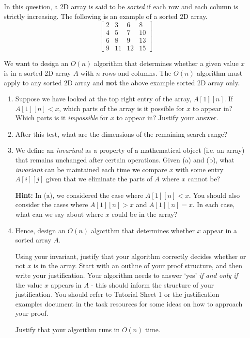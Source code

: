 \documentclass[12pt]{article}
\begin{document}

\begin{question}
In this question, a 2D array is said to be \emph{sorted} if each row and each column is strictly increasing. The following is an example of a sorted 2D array.
\[\begin{bmatrix}
    2 & 3 & 6 & 8 \\
    4 & 5 & 7 & 10 \\
    6 & 8 & 9 & 13 \\
    9 & 11 & 12 & 15
\end{bmatrix}\]

We want to design an $O(n)$ algorithm that determines whether a given value $x$ is in a sorted 2D array $A$ with $n$ rows and columns. The $O(n)$ algorithm must apply to any sorted 2D array and \textbf{not} the above example sorted 2D array only.

\begin{enumerate}
    \item Suppose we have looked at the top right entry of the array, $A[1][n]$. If $A[1][n] < x$, which parts of the array is it possible for $x$ to appear in? Which parts is it \textit{impossible} for $x$ to appear in? Justify your answer.
    \item After this test, what are the dimensions of the remaining search range?

    \item We define an \emph{invariant} as a property of a mathematical object (i.e. an array) that remains unchanged after certain operations. Given (a) and (b), what \emph{invariant} can be maintained each time we compare $x$ with some entry $A[i][j]$ given that we eliminate the parts of $A$ where $x$ cannot be? 

    \textbf{Hint:} In (a), we considered the case where $A[1][n] < x$. You should also consider the cases where $A[1][n] > x$ and $A[1][n] = x$. In each case, what can we say about where $x$ could be in the array?
    
    \item Hence, design an $O(n)$ algorithm that determines whether $x$ appear in a sorted array $A$.

    Using your invariant, justify that your algorithm correctly decides whether or not $x$ is in the array. Start with an outline of your proof structure, and then write your justification. Your algorithm needs to answer `yes' \textit{if and only if} the value $x$ appears in $A$ - this should inform the structure of your justification. You should refer to Tutorial Sheet 1 or the justification examples document in the task resources for some ideas on how to approach your proof.

    Justify that your algorithm runs in $O(n)$ time.

\end{enumerate}
\end{question}
\end{document}
